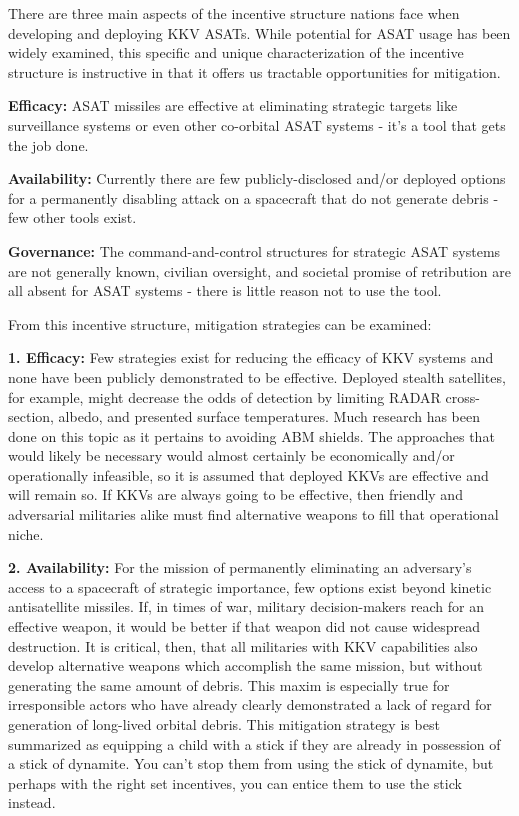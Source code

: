 There are three main aspects of the incentive structure nations face
when developing and deploying KKV ASATs.  While potential for ASAT
usage has been widely examined, this specific and unique
characterization of the incentive structure is instructive in that it
offers us tractable opportunities for mitigation.

\textbf{Efficacy:} ASAT missiles are effective at eliminating
strategic targets like surveillance systems or even other co-orbital
ASAT systems - it's a tool that gets the job done.

\textbf{Availability:} Currently there are few publicly-disclosed
and/or deployed options for a permanently disabling attack on a
spacecraft that do not generate debris - few other tools exist.

\textbf{Governance:} The command-and-control structures for strategic
ASAT systems are not generally known, civilian oversight, and societal
promise of retribution are all absent for ASAT systems - there is
little reason not to use the tool.

From this incentive structure, mitigation strategies can be examined:

\textbf{1. Efficacy:} Few strategies exist for reducing the efficacy
of KKV systems and none have been publicly demonstrated to be
effective.  Deployed stealth satellites, for example, might decrease
the odds of detection by limiting RADAR cross-section, albedo, and
presented surface temperatures.  Much research has been done on this
topic as it pertains to avoiding ABM shields.  The approaches that
would likely be necessary would almost certainly be economically
and/or operationally infeasible, so it is assumed that deployed KKVs
are effective and will remain so.  If KKVs are always going to be
effective, then friendly and adversarial militaries alike must find
alternative weapons to fill that operational niche.

\textbf{2. Availability:} For the mission of permanently eliminating
an adversary's access to a spacecraft of strategic importance, few
options exist beyond kinetic antisatellite missiles.  If, in times of
war, military decision-makers reach for an effective weapon, it would
be better if that weapon did not cause widespread destruction.  It is
critical, then, that all militaries with KKV capabilities also develop
alternative weapons which accomplish the same mission, but without
generating the same amount of debris.  This maxim is especially true
for irresponsible actors who have already clearly demonstrated a lack
of regard for generation of long-lived orbital debris.  This
mitigation strategy is best summarized as equipping a child with a
stick if they are already in possession of a stick of dynamite.  You
can't stop them from using the stick of dynamite, but perhaps with the
right set incentives, you can entice them to use the stick instead.

